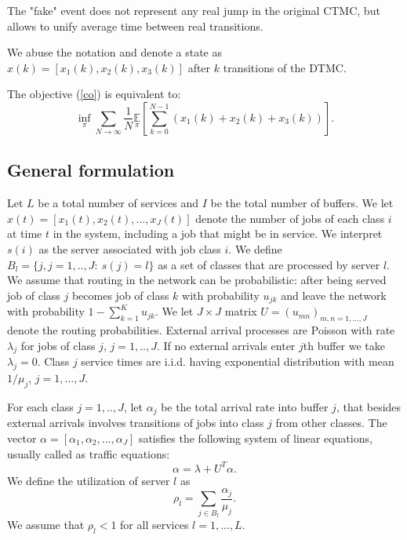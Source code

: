 \documentclass[11pt]{article}
\newcommand{\E}{\mathbb{E}}
\theoremstyle{definition}
\numberwithin{equation}{section}
\begin{document}
The "fake" event  does not
represent any real jump in the original CTMC, but allows to unify average time between real
transitions.

We abuse the notation and denote a state  as $x(k) = [x_1(k), x_2(k), x_3(k)]$ after $k$ transitions of the DTMC.


The objective (\ref{co}) is equivalent to:
\begin{equation}\inf\limits_{\pi} \sum\limits_{N\rightarrow \infty}\frac{1}{N}\underset{\pi}{\E}\left[ \sum\limits_{k=0}^{N-1}(x_1(k)+x_2(k)+x_3(k))\right].\end{equation}





\subsection{General formulation}




Let $L$ be a total number of services and $I$ be the total number of buffers.  We let $x(t) = [x_1(t), x_2(t), ..., x_J(t)]$ denote the number of jobs of each class $i$ at time $t$ in the system, including a job that might be in service. We interpret $s(i)$ as the server associated with job class $i$. We define $B_l = \{j, j=1, .., J:~ s(j)  = l\}$ as a set of classes that are processed by server $l$. We assume that routing in the network can be probabilistic: after being served  job of class $j$ becomes job of  class $k$ with probability $u_{jk}$ and leave the network with probability $1 - \sum\limits_{k=1}^K u_{jk}.$ We let $J\times J$ matrix $U = (u_{mn})_{m,n=1,..., J}$ denote the routing probabilities. External arrival processes are Poisson with rate $\lambda_j$ for jobs of class $j$, $j=1, .., J$. If no  external arrivals enter $j$th buffer we take $\lambda_j=0$. Class $j$ service times are i.i.d. having exponential
distribution with mean $1/\mu_j$, $j=1, ..., J$.


For each class $j = 1, .., J$, let $\alpha_j$ be the total arrival rate
into buffer $j$, that besides external arrivals involves transitions of jobs into class $j$ from
other classes. The vector $\alpha = [\alpha_1, \alpha_2, ..., \alpha_J]$ satisfies the following system of linear
equations, usually called as traffic equations: \begin{equation}\alpha = \lambda +U^T\alpha.\end{equation} We define the utilization of server $l$ as \begin{equation}\rho_l = \sum\limits_{j\in B_l} \frac{\alpha_j}{\mu_j}.\end{equation}
We assume that $\rho_l<1$ for all  services $l = 1, ..., L$.
\end{document}
